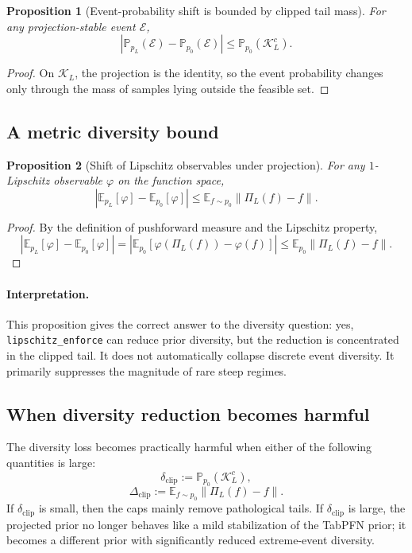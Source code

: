 \documentclass[11pt]{article}
\newtheorem{proposition}{Proposition}
\newcommand{\E}{\mathbb{E}}
\newcommand{\Prob}{\mathbb{P}}
\newcommand{\1}{\mathbf{1}}
\newcommand{\norm}[1]{\left\lVert #1 \right\rVert}
\newcommand{\abs}[1]{\left\lvert #1 \right\rvert}
\begin{document}
\begin{proposition}[Event-probability shift is bounded by clipped tail mass]
For any projection-stable event $\mathcal{E}$,
\begin{equation}
  \abs{\Prob_{p_L}(\mathcal{E}) - \Prob_{p_0}(\mathcal{E})}
  \le
  \Prob_{p_0}(\mathcal{K}_L^c).
\end{equation}
\end{proposition}

\begin{proof}
On $\mathcal{K}_L$, the projection is the identity, so the event probability changes only through the mass of samples lying outside the feasible set.
\end{proof}

\subsection{A metric diversity bound}
\begin{proposition}[Shift of Lipschitz observables under projection]
For any $1$-Lipschitz observable $\varphi$ on the function space,
\begin{equation}
  \abs{\E_{p_L}[\varphi] - \E_{p_0}[\varphi]}
  \le
  \E_{f \sim p_0}\norm{\Pi_L(f)-f}.
\end{equation}
\end{proposition}

\begin{proof}
By the definition of pushforward measure and the Lipschitz property,
\[
  \abs{\E_{p_L}[\varphi] - \E_{p_0}[\varphi]}
  =
  \abs{\E_{p_0}[\varphi(\Pi_L(f)) - \varphi(f)]}
  \le
  \E_{p_0}\norm{\Pi_L(f)-f}.
\]
\end{proof}

\paragraph{Interpretation.}
This proposition gives the correct answer to the diversity question: yes, \texttt{lipschitz\_enforce} can reduce prior diversity, but the reduction is concentrated in the clipped tail. It does not automatically collapse discrete event diversity. It primarily suppresses the magnitude of rare steep regimes.

\subsection{When diversity reduction becomes harmful}
The diversity loss becomes practically harmful when either of the following quantities is large:
\begin{equation}
  \delta_{\mathrm{clip}}
  :=
  \Prob_{p_0}(\mathcal{K}_L^c),
\end{equation}
\begin{equation}
  \Delta_{\mathrm{clip}}
  :=
  \E_{f \sim p_0}\norm{\Pi_L(f)-f}.
\end{equation}
If $\delta_{\mathrm{clip}}$ is small, then the caps mainly remove pathological tails. If $\delta_{\mathrm{clip}}$ is large, the projected prior no longer behaves like a mild stabilization of the TabPFN prior; it becomes a different prior with significantly reduced extreme-event diversity.
\end{document}
